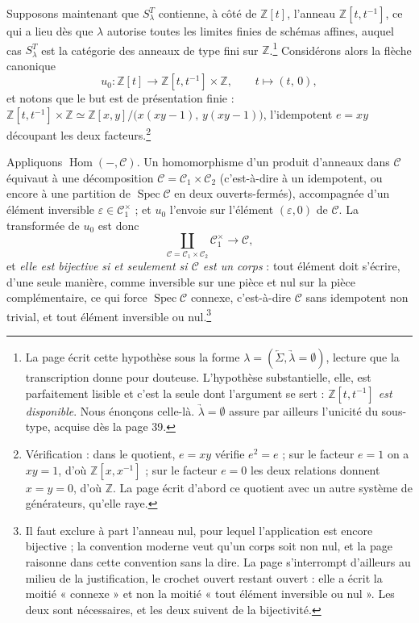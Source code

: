 \documentclass[11pt,a4paper]{article}
\begin{document}
Supposons maintenant que $S^{T}_{\lambda}$ contienne, à côté de
$\mathbb{Z}[t]$, l'anneau $\mathbb{Z}[t,t^{-1}]$, ce qui a lieu dès que
$\lambda$ autorise toutes les limites finies de schémas affines, auquel cas
$S^{T}_{\lambda}$ est la catégorie des anneaux de type fini sur
$\mathbb{Z}$.\footnote{La page écrit cette hypothèse sous la forme
$\lambda = (\underleftarrow{\Sigma}, \underrightarrow{\lambda} = \emptyset)$,
lecture que la transcription donne pour douteuse. L'hypothèse substantielle,
elle, est parfaitement lisible et c'est la seule dont l'argument se sert :
\emph{$\mathbb{Z}[t,t^{-1}]$ est disponible}. Nous énonçons celle-là.
$\underrightarrow{\lambda} = \emptyset$ assure par ailleurs l'unicité du
sous-type, acquise dès la page 39.} Considérons alors la flèche canonique
\[
u_{0} : \mathbb{Z}[t] \longrightarrow \mathbb{Z}[t,t^{-1}] \times \mathbb{Z},
\qquad t \longmapsto (t,\,0),
\]
et notons que le but est de présentation finie :
$\mathbb{Z}[t,t^{-1}] \times \mathbb{Z} \simeq \mathbb{Z}[x,y] \big/
\bigl(x(xy-1),\, y(xy-1)\bigr)$, l'idempotent $e = xy$ découpant les deux
facteurs.\footnote{Vérification : dans le quotient, $e = xy$ vérifie
$e^{2} = e$ ; sur le facteur $e = 1$ on a $xy = 1$, d'où
$\mathbb{Z}[x,x^{-1}]$ ; sur le facteur $e = 0$ les deux relations donnent
$x = y = 0$, d'où $\mathbb{Z}$. La page écrit d'abord ce quotient avec un autre
système de générateurs, qu'elle raye.}

Appliquons $\operatorname{Hom}(-,\mathcal{C})$. Un homomorphisme d'un produit
d'anneaux dans $\mathcal{C}$ équivaut à une décomposition
$\mathcal{C} = \mathcal{C}_{1} \times \mathcal{C}_{2}$ (c'est-à-dire à un
idempotent, ou encore à une partition de $\operatorname{Spec}\mathcal{C}$ en
deux ouverts-fermés), accompagnée d'un élément inversible
$\varepsilon \in \mathcal{C}_{1}^{\times}$ ; et $u_{0}$ l'envoie sur l'élément
$(\varepsilon, 0)$ de $\mathcal{C}$. La transformée de $u_{0}$ est donc
\[
\coprod_{\mathcal{C} = \mathcal{C}_{1} \times \mathcal{C}_{2}}
\mathcal{C}_{1}^{\times} \longrightarrow \mathcal{C},
\]
et \emph{elle est bijective si et seulement si $\mathcal{C}$ est un corps} :
tout élément doit s'écrire, d'une seule manière, comme inversible sur une pièce
et nul sur la pièce complémentaire, ce qui force $\operatorname{Spec}
\mathcal{C}$ connexe, c'est-à-dire $\mathcal{C}$ sans idempotent non trivial, et
tout élément inversible ou nul.\footnote{Il faut exclure à part l'anneau nul,
pour lequel l'application est encore bijective ; la convention moderne veut
qu'un corps soit non nul, et la page raisonne dans cette convention sans la
dire. La page s'interrompt d'ailleurs au milieu de la justification, le crochet
ouvert restant ouvert : elle a écrit la moitié « connexe » et non la moitié
« tout élément inversible ou nul ». Les deux sont nécessaires, et les deux
suivent de la bijectivité.}
\end{document}
